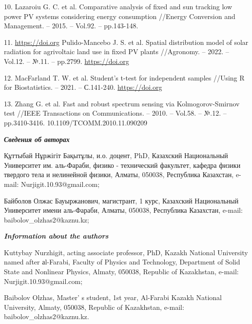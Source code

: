 \begin{references}
10. Lazaroiu G. C. et al. Comparative analysis of fixed and sun
tracking low power PV systems considering energy consumption //Energy
Conversion and Management. -- 2015. -- Vol.92. -- pp.143-148.

11. \href{https://doi.org/10.1016/j.enconman.2014.12.046\%20}{https://doi.org}
Pulido-Mancebo J. S. et al. Spatial distribution model of solar
radiation for agrivoltaic land use in fixed PV plants //Agronomy. --
2022. -- Vol.12. -- №.11. -- pp.2799.
\href{https://doi.org/10.3390/agronomy12112799}{https://doi.org}

12. MacFarland T. W. et al. Student's t-test for independent samples
//Using R for Biostatistics. -- 2021. -- С.141-240.
\href{https://doi.org/10.1007/978-3-030-62404-0_3}{https://doi.org}

13. Zhang G. et al. Fast and robust spectrum sensing via
Kolmogorov-Smirnov test //IEEE Transactions on Communications. --
2010. -- Vol.58. -- №.12. -- pp.3410-3416.
10.1109/TCOMM.2010.11.090209
\end{references}

\begin{authorinfo}
\emph{{\bfseries Сведения об авторах}}

Құттыбай Нұржігіт Бақытұлы, и.о. доцент, PhD, Казахский Национальный
Университет им. аль-Фараби, физико - технический факультет, кафедра физики
твердого тела и нелинейной физики, Алматы, 050038, Республика Казахстан,
e-mail: Nurjigit.10.93@gmail.com;

Байболов Олжас Бауыржанович, магистрант, 1 курс, Казахский Национальный
Университет имени аль-Фараби, Алматы, 050038, Республика Казахстан,
e-mail: baibolov\_olzhas2@kaznu.kz;

\emph{{\bfseries Information about the authors}}

Kuttybay Nurzhigit, acting associate professor, PhD, Kazakh National
University named after аl-Farabi, Faculty of Physics and Technology,
Department of Solid State and Nonlinear Physics, Almaty, 050038,
Republic of Kazakhstan, e-mail: \\Nurjigit.10.93@gmail.com;

Baibolov Olzhas, Master' s student, 1st year, Al-Farabi
Kazakh National University, Almaty, 050038, Republic of Kazakhstan,
e-mail: baibolov\_olzhas2@kaznu.kz.
\end{authorinfo}
